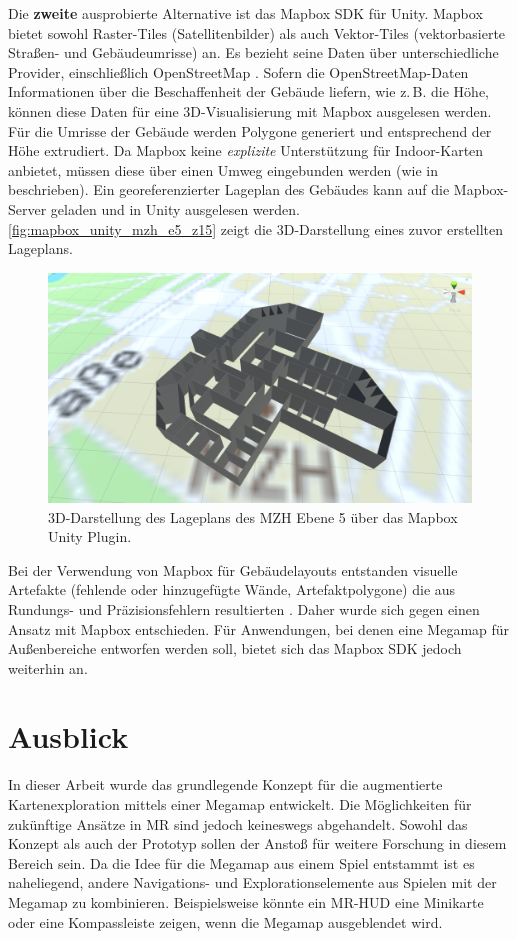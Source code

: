 Die \textbf{zweite} ausprobierte Alternative ist das Mapbox SDK für Unity.
Mapbox bietet sowohl Raster-Tiles (Satellitenbilder) als auch Vektor-Tiles (vektorbasierte Straßen- und Gebäudeumrisse) an.
Es bezieht seine Daten über unterschiedliche Provider, einschließlich OpenStreetMap \autocite{Mapbox2018}.
Sofern die OpenStreetMap-Daten Informationen über die Beschaffenheit der Gebäude liefern, wie z.\,B. die Höhe, können diese Daten für eine 3D-Visualisierung mit Mapbox ausgelesen werden.
Für die Umrisse der Gebäude werden Polygone generiert und entsprechend der Höhe extrudiert.
Da Mapbox keine \emph{explizite} Unterstützung für Indoor-Karten anbietet, müssen diese über einen Umweg eingebunden werden (wie in \cite{Mapbox2018b, Pavani2018, Clarke2017} beschrieben).
Ein georeferenzierter Lageplan des Gebäudes kann auf die Mapbox-Server geladen und in Unity ausgelesen werden.
\autoref{fig:mapbox_unity_mzh_e5_z15} zeigt die 3D-Darstellung eines zuvor erstellten Lageplans.
\begin{figure}[h]
    \centering
    \includegraphics[width=0.65\linewidth]{figures/mapbox_unity_mzh_e5_z15_working}
    \caption{3D-Darstellung des Lageplans des MZH Ebene 5 über das Mapbox Unity Plugin.}
    \label{fig:mapbox_unity_mzh_e5_z15}
\end{figure}
Bei der Verwendung von Mapbox für Gebäudelayouts entstanden visuelle Artefakte (fehlende oder hinzugefügte Wände, Artefaktpolygone) die aus Rundungs- und Präzisionsfehlern resultierten \parencite{Kahyaoglu2017, Mapbox2018c}.
Daher wurde sich gegen einen Ansatz mit Mapbox entschieden.
Für Anwendungen, bei denen eine Megamap für Außenbereiche entworfen werden soll, bietet sich das Mapbox SDK jedoch weiterhin an.

\section{Ausblick}
In dieser Arbeit wurde das grundlegende Konzept für die augmentierte Kartenexploration mittels einer Megamap entwickelt.
Die Möglichkeiten für zukünftige Ansätze in MR sind jedoch keineswegs abgehandelt.
Sowohl das Konzept als auch der Prototyp sollen der Anstoß für weitere Forschung in diesem Bereich sein.
Da die Idee für die Megamap aus einem Spiel entstammt ist es naheliegend, andere Navigations- und Explorationselemente aus Spielen mit der Megamap zu kombinieren.
Beispielsweise könnte ein MR-HUD eine Minikarte oder eine Kompassleiste zeigen, wenn die Megamap ausgeblendet wird.

